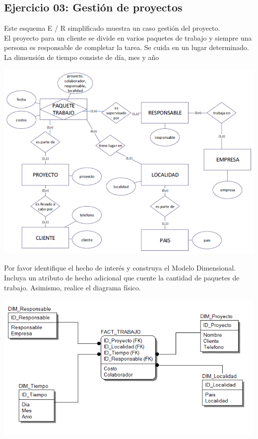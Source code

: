 \documentclass[12pt,letterpaper]{article}
\begin{document}
\subsection{Ejercicio 03: Gestión de proyectos}
Este esquema E / R simplificado muestra un caso gestión del proyecto.
\\El proyecto para un cliente se divide en varios paquetes de trabajo y siempre una persona es responsable de completar la
tarea. Se cuida en un lugar determinado.
\\La dimensión de tiempo consiste de día, mes y año
\begin{center}
    \includegraphics[width=14cm]{img/ejer3.png}  
\end{center}
Por favor identifique el hecho de interés y construya el Modelo Dimensional. Incluya un atributo de hecho adicional que
cuente la cantidad de paquetes de trabajo. Asimismo, realice el diagrama físico.
\begin{center}
    \includegraphics[width=15cm]{img/3.png}  
\end{center}
\end{document}
